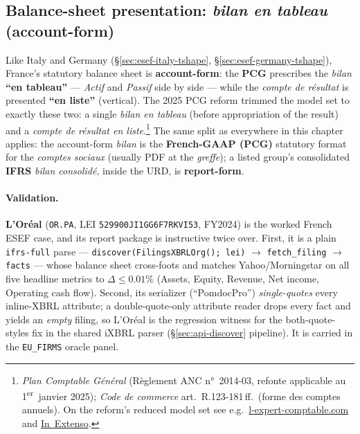 \documentclass[11pt,a4paper]{report}
\begin{document}
\subsection{Balance-sheet presentation: \emph{bilan en tableau} (account-form)}
\label{sec:esef-france-tshape}

Like Italy and Germany (\S\ref{sec:esef-italy-tshape}, \S\ref{sec:esef-germany-tshape}), France's statutory
balance sheet is \textbf{account-form}: the \textbf{PCG} prescribes the \emph{bilan} \textbf{``en tableau''}
--- \emph{Actif} and \emph{Passif} side by side --- while the \emph{compte de résultat} is presented
\textbf{``en liste''} (vertical). The 2025 PCG reform trimmed the model set to exactly these two: a single
\emph{bilan en tableau} (before appropriation of the result) and a \emph{compte de résultat en
liste}.\footnote{\emph{Plan Comptable Général} (Règlement ANC n°~2014-03, refonte applicable au 1\textsuperscript{er}~janvier
2025); \emph{Code de commerce} art.~R.123-181\,ff.\ (forme des comptes annuels). On the reform's reduced model
set see e.g.\
\href{https://www.l-expert-comptable.com/a/7298-la-reforme-du-plan-comptable-general.html}{l-expert-comptable.com}
and \href{https://www.inextenso.fr/magazin/gerer-developper-mon-activite/reforme-du-plan-comptable-general-pcg-ce-qui-change-pour-votre-entreprise-en-2025/}{In~Extenso}.}
The same split as everywhere in this chapter applies: the account-form \emph{bilan} is the \textbf{French-GAAP
(PCG)} statutory format for the \emph{comptes sociaux} (usually PDF at the \emph{greffe}); a listed group's
consolidated \textbf{IFRS} \emph{bilan consolidé}, inside the URD, is \textbf{report-form}.

\paragraph{Validation.} \textbf{L'Or\'eal} (\texttt{OR.PA}, LEI \texttt{529900JI1GG6F7RKVI53}, FY2024) is the
worked French ESEF case, and its report package is instructive twice over. First, it is a plain
\texttt{ifrs-full} parse --- \texttt{discover(FilingsXBRLOrg(); lei)} \(\to\) \texttt{fetch\_filing} \(\to\)
\texttt{facts} --- whose balance sheet cross-foots and matches Yahoo/Morningstar on all five headline metrics
to \(\Delta\le 0.01\%\) (Assets, Equity, Revenue, Net income, Operating cash flow). Second, its serializer
(``PomdocPro'') \emph{single-quotes} every inline-XBRL attribute; a double-quote-only attribute reader drops
every fact and yields an \emph{empty} filing, so L'Or\'eal is the regression witness for the both-quote-styles
fix in the shared iXBRL parser (\S\ref{sec:api-discover} pipeline). It is carried in the \texttt{EU\_FIRMS}
oracle panel.
\end{document}
